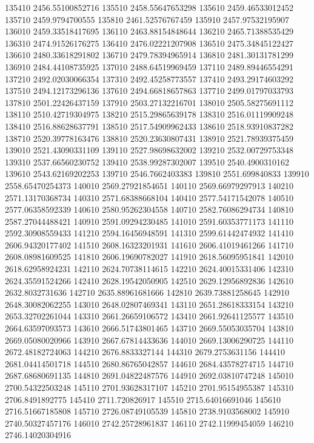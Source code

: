 {135410 2456.55100852716
135510 2458.55647653298
135610 2459.46533012452
135710 2459.9794700555
135810 2461.52576767459
135910 2457.97532195907
136010 2459.33518417695
136110 2463.88154848644
136210 2465.71388535429
136310 2474.91526176275
136410 2476.02221207908
136510 2475.34845122427
136610 2480.33618291802
136710 2479.78394965914
136810 2481.30131781299
136910 2484.44108735925
137010 2488.64519969459
137110 2489.89446554291
137210 2492.02030066354
137310 2492.45258773557
137410 2493.29174603292
137510 2494.12173296136
137610 2494.66818657863
137710 2499.01797033793
137810 2501.22426437159
137910 2503.27132216701
138010 2505.58275691112
138110 2510.42719304975
138210 2515.29865639178
138310 2516.01119909248
138410 2516.88628637791
138510 2517.54909962433
138610 2518.93910837282
138710 2520.39778163476
138810 2520.23630807431
138910 2521.78939375459
139010 2521.43090331109
139110 2527.98698632002
139210 2532.00729753348
139310 2537.66560230752
139410 2538.99287302007
139510 2540.4900310162
139610 2543.62169202253
139710 2546.7662403383
139810 2551.699840833
139910 2558.65470254373
140010 2569.27921854651
140110 2569.66979297913
140210 2571.13170368734
140310 2571.68388668104
140410 2577.54171542078
140510 2577.06358592339
140610 2580.95262304558
140710 2582.76086294734
140810 2587.27044488421
140910 2591.09294230485
141010 2591.60353771173
141110 2592.30908559433
141210 2594.16456948591
141310 2599.61442474932
141410 2606.94320177402
141510 2608.16323201931
141610 2606.41019461266
141710 2608.08981609525
141810 2606.19690782027
141910 2618.56095951841
142010 2618.62958924231
142110 2624.70738114615
142210 2624.40015331406
142310 2624.35591524266
142410 2628.19542050905
142510 2629.12956892836
142610 2632.8032731636
142710 2635.88961681666
142810 2639.73881258645
142910 2648.30082062255
143010 2648.02807469341
143110 2651.28618333154
143210 2653.32702261044
143310 2661.26659106572
143410 2661.92641125577
143510 2664.63597093573
143610 2666.51743801465
143710 2669.55053035704
143810 2669.05080020966
143910 2667.67814433636
144010 2669.13006290725
144110 2672.48182724063
144210 2676.8833327144
144310 2679.2753631156
144410 2681.04414501718
144510 2680.86765042857
144610 2684.43578274715
144710 2687.68680691135
144810 2691.04822487576
144910 2692.03810747248
145010 2700.54322503248
145110 2701.93628317107
145210 2701.95154955387
145310 2706.8491892775
145410 2711.720826917
145510 2715.64016691046
145610 2716.51667185808
145710 2726.08749105539
145810 2738.9103568002
145910 2740.50327457176
146010 2742.25728961837
146110 2742.11999454059
146210 2746.14020304916
}
